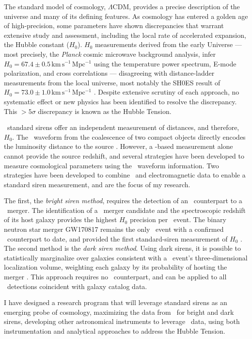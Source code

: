 The standard model of cosmology, $\Lambda$CDM, provides a precise description of the universe and many of its defining features. As cosmology has entered a golden age of high-precision, some parameters have shown discrepancies that warrant extensive study and assessment, including the local rate of accelerated expansion, the Hubble constant ($H_0$). $H_0$ measurements derived from the early Universe --- most precisely, the \textit{Planck} cosmic microwave background analysis, infer $H_0 = 67.4\pm0.5\,\mathrm{km\,s^{-1}\,Mpc^{-1}}$ using the temperature power spectrum, E-mode polarization, and cross correlations \citep{Planck2020} --- disagreeing with distance-ladder measurements from the local universe, most notably the SH0ES result of $H_0 = 73.0\pm1.0\,\mathrm{km\,s^{-1}\,Mpc^{-1}}$ \citep{Riess2022}. 
Despite extensive scrutiny of each approach, no systematic effect or new physics has been identified to resolve the discrepancy.
This $>5\sigma$ discrepancy is known as the Hubble Tension. 

\GW\ standard sirens offer an independent measurement of distances, and therefore, $H_0$. The \GW\ waveform from the coalescence of two compact objects directly encodes the luminosity distance to the source \citep{Schutz1986}. However, a \GW-based measurement alone cannot provide the source redshift, and several strategies have been developed to measure cosmological parameters using the \GW\ waveform information. Two strategies have been developed to combine \GW\ and electromagnetic data to enable a standard siren measurement, and are the focus of my research.

The first, the \textit{bright siren method}, requires the detection of an \EM\ counterpart to a \GW\ merger. The identification of a \GW\ merger candidate and the spectroscopic redshift of its host galaxy provides the highest $H_0$ precision per \GW\ event. The binary neutron star merger GW170817 remains the only \GW\ event with a confirmed \EM\ counterpart to date, and provided the first standard-siren measurement of $H_0$ \citep{2017ApJ...848L..12A,Abbott2017Nature,SoaresSantos2017}. The second method is the \textit{dark siren method}. Using dark sirens, it is possible to statistically marginalize over galaxies consistent with a \GW\ event's three-dimensional localization volume, weighting each galaxy by its probability of hosting the merger \citep{Gray2023}. This approach requires no \EM\ counterpart, and can be applied to all \GW\ detections coincident with galaxy catalog data.

I have designed a research program that will leverage standard sirens as an emerging probe of cosmology, maximizing the data from \LSST\ for bright and dark sirens, developing other astronomical instruments to leverage \LSST\ data, using both instrumentation and analytical approaches to address the Hubble Tension. 